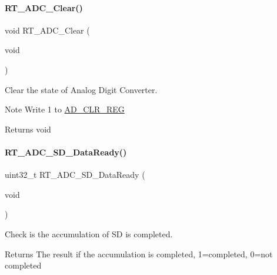 \paragraph{\texorpdfstring{R\+T\+\_\+\+A\+D\+C\+\_\+\+Clear()}{RT\_ADC\_Clear()}}
{\footnotesize\ttfamily void R\+T\+\_\+\+A\+D\+C\+\_\+\+Clear (\begin{DoxyParamCaption}\item[{void}]{ }\end{DoxyParamCaption})}



Clear the state of Analog Digit Converter. 

\begin{DoxyNote}{Note}
Write 1 to \mbox{\hyperlink{a00020_a909cbad2fef284b18a87a5bb1395ef11}{A\+D\+\_\+\+C\+L\+R\+\_\+\+R\+EG}} 
\end{DoxyNote}
\begin{DoxyReturn}{Returns}
void 
\end{DoxyReturn}
\mbox{\label{a00002_a7fd97b414a33170e6013c88f37e028a9}} 
\paragraph{\texorpdfstring{R\+T\+\_\+\+A\+D\+C\+\_\+\+S\+D\+\_\+\+Data\+Ready()}{RT\_ADC\_SD\_DataReady()}}
{\footnotesize\ttfamily uint32\+\_\+t R\+T\+\_\+\+A\+D\+C\+\_\+\+S\+D\+\_\+\+Data\+Ready (\begin{DoxyParamCaption}\item[{void}]{ }\end{DoxyParamCaption})}



Check is the accumulation of SD is completed. 

\begin{DoxyReturn}{Returns}
The result if the accumulation is completed, 1=completed, 0=not completed 
\end{DoxyReturn}
\mbox{\label{a00002_a1934526cb3d40a1b0ae7a0f19597a4ff}} 
